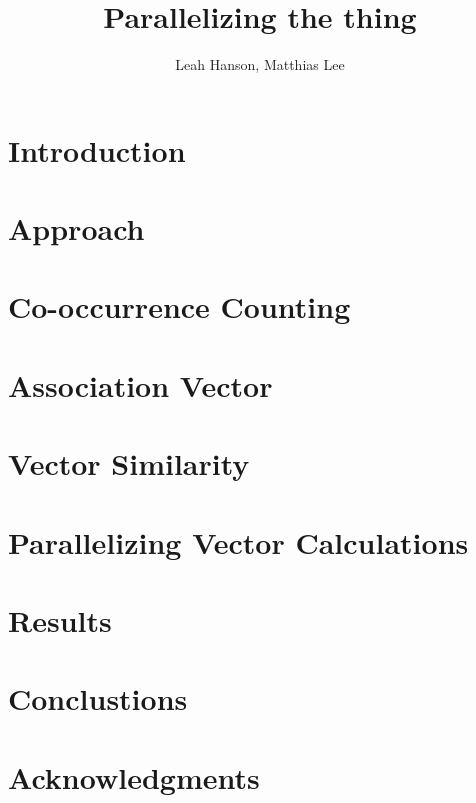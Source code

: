 \documentclass[12pt]{article}
\title{Parallelizing the thing}
\author{Leah Hanson, Matthias Lee }
\begin{document}
\maketitle

\section{Introduction}

\section{Approach}

\section{Co-occurrence Counting}

\section{Association Vector}

\section{Vector Similarity}

\section{Parallelizing Vector Calculations}

\section{Results}

\section{Conclustions}

\section{Acknowledgments}

\end{document}
